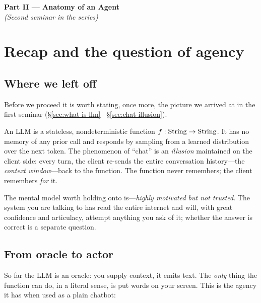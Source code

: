 
\bigskip
\begin{center}
  {\Large\sffamily\bfseries\color{cgblue} Part II \;---\; Anatomy of an Agent}\\[0.4em]
  \textit{(Second seminar in the series)}
\end{center}
\bigskip

\section{Recap and the question of agency}\label{sec:recap-agency}

\subsection{Where we left off}

Before we proceed it is worth stating, once more, the picture we
arrived at in the first seminar (\S\ref{sec:what-is-llm}--%
\S\ref{sec:chat-illusion}).

\begin{greybox}
  An LLM is a stateless, nondeterministic function
  $f : \mathrm{String} \to \mathrm{String}$.  It has no memory of any prior call and
  responds by sampling from a learned distribution over the next token.
  The phenomenon of ``chat'' is an \emph{illusion} maintained on the
  client side: every turn, the client re-sends the entire conversation
  history---the \emph{context window}---back to the function.  The
  function never remembers; the client remembers \emph{for} it.
\end{greybox}

The mental model worth holding onto is---\emph{highly motivated but
not trusted}.  The system you are talking to has read the entire
internet and will, with great confidence and articulacy, attempt
anything you ask of it; whether the answer is correct is a separate
question.

\subsection{From oracle to actor}

So far the LLM is an oracle: you supply context, it emits text.  The
\emph{only} thing the function can do, in a literal sense, is put
words on your screen.  This is the agency it has when used as a
plain chatbot:

